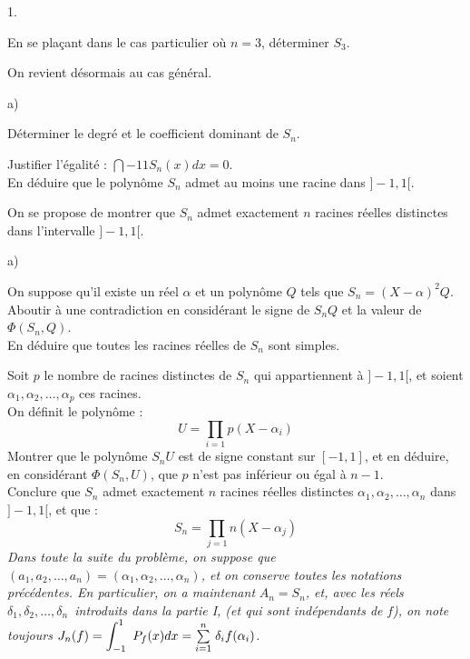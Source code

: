 \documentclass[11pt]{article}%
\begin{document}
\begin{noliste}{1.}
 \setlength{\itemsep}{4mm}
\item En se plaçant dans le cas particulier où $n = 3$, déterminer
$S_{3}$.

\item On revient désormais au cas général.

\begin{noliste}{a)}
 \setlength{\itemsep}{2mm}
\item Déterminer le degré et le coefficient dominant de $S_{n}$.

\item Justifier l'égalité : $\dint{-1}{1}S_{n}(x)dx = 0$.\\
En déduire que le polynôme $S_{n}$ admet au moins une racine dans
$]-1,1[$.
\end{noliste}

\item On se propose de montrer que $S_{n}$ admet exactement $n$ racines
réelles distinctes dans l'intervalle $]-1,1[$.

\begin{noliste}{a)}
 \setlength{\itemsep}{2mm}
\item On suppose qu'il existe un réel $\alpha $ et un polynôme $Q$ tels
que $S_{n} = (X-\alpha )^{2}Q$.\\
Aboutir à une contradiction en considérant le signe de $S_{n}Q$ et la
valeur
de $\Phi (S_{n},Q)$.\\
En déduire que toutes les racines réelles de $S_{n}$ sont simples.

\item Soit $p$ le nombre de racines distinctes de $S_{n}$ qui
appartiennent à
$]-1,1[$, et soient $\alpha_{1},\alpha_{2},\dots,\alpha_{p}$ ces
racines.\\
On définit le polynôme : 
\[
U = \prod_{i = 1}{p}(X-\alpha_{i})
\]
Montrer que le polynôme $S_{n}U$ est de signe constant sur $[-1,1]$, et
en déduire, en considérant $\Phi (S_{n},U)$, que $p$ n'est pas
inférieur ou égal à
$n-1$.\\
Conclure que $S_{n}$ admet exactement $n$ racines réelles distinctes
$\alpha
_{1},\alpha_{2},\dots,\alpha_{n}$ dans $]-1,1[$, et que : 
\[
S_{n} = \prod_{j = 1}{n}(X-\alpha_{j})
\]
\textit{Dans toute la suite du problème, on suppose que
}$(a_{1},a_{2},\dots,a_{n}) =
(\alpha_{1},\alpha_{2},\dots,\alpha_{n})$\textit{, et on
conserve toutes les notations précédentes. En particulier, on a
maintenant }$A_{n} = S_{n}$\textit{, et, avec les réels
}$\delta_{1},\delta_{2},\dots,\delta_{n}$\textit{\ introduits dans la
partie I, (et qui sont indépendants de }$f$\textit{), on note toujours
}$J_{n}(f) = \displaystyle \int_{-1}^{1}\ P_{f}(x)dx = {\textstyle\sum\limits_{i =
1}^{n}}\hspace{.1cm}\delta_{i}f(\alpha_{i})$\textit{. }
\end{noliste}


\end{noliste}
\end{document}
